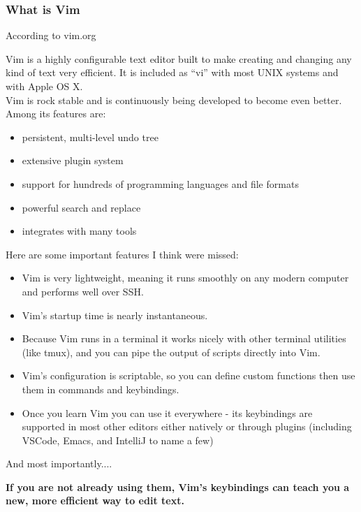 \documentclass{beamer}
\begin{document}
\begin{frame}[fragile]
    \frametitle{What is Vim}
    \centerline{\large According to vim.org}
    \vspace{0.5cm}
    \small Vim is a highly configurable text editor built to make creating and changing any kind of text very efficient. It is included as \enquote{vi} with most UNIX systems and with Apple OS X.\\
    \vspace{0.5cm}
    Vim is rock stable and is continuously being developed to become even better. Among its features are:\\
    \begin{itemize}
	\item persistent, multi-level undo tree
	\item extensive plugin system
	\item support for hundreds of programming languages and file formats
	\item powerful search and replace
	\item integrates with many tools
    \end{itemize}
\end{frame}

\begin{frame}[fragile]
    \centerline{\large Here are some important features I think were missed:}
    \vspace{0.5cm}
    \small
    \begin{itemize}
	\item Vim is very lightweight, meaning it runs smoothly on any modern computer and performs well over SSH.
	\item Vim's startup time is nearly instantaneous.
	\item Because Vim runs in a terminal it works nicely with other terminal utilities (like tmux), and you can pipe the output of scripts directly into Vim.
	\item Vim's configuration is scriptable, so you can define custom functions then use them in commands and keybindings.
	\item Once you learn Vim you can use it everywhere - its keybindings are supported in most other editors either natively or through plugins (including VSCode, Emacs, and IntelliJ to name a few)
    \end{itemize}
\end{frame}

\begin{frame}[fragile]
    \centerline{\large And most importantly....}
    \vspace{0.5cm}
    \small \textbf{If you are not already using them, Vim's keybindings can teach you a new, more efficient way to edit text.}\\
\end{frame}
\end{document}
